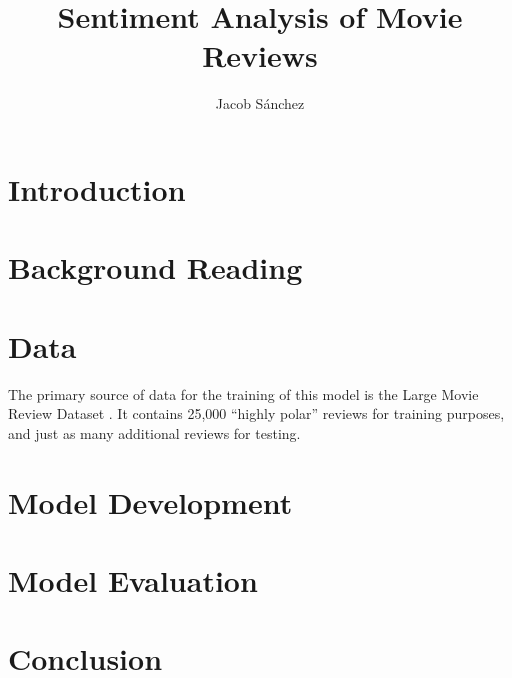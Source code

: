 \documentclass[a4paper,12pt]{article}
\title{Sentiment Analysis of Movie Reviews}
\author{Jacob Sánchez}
\date{} %
\begin{document}
\maketitle


\section{Introduction}
\section{Background Reading}
\section{Data}

The primary source of data for the training of this model is the Large Movie Review Dataset \parencite{maas2011ACL}. It contains 25,000 \enquote{highly polar} reviews for training purposes, and just as many additional reviews for testing.

\section{Model Development}
\section{Model Evaluation}
\section{Conclusion}

\printbibliography
\end{document}
